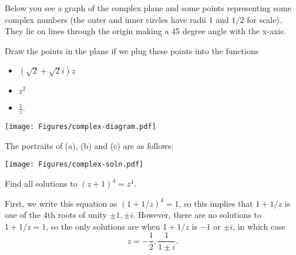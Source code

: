 \documentclass[11pt,dvipsnames]{book}
\numberwithin{equation}{section} %
\numberwithin{figure}{section} %
\numberwithin{table}{section} %
\begin{document}
\begin{exercise}  Below you see a graph of the complex plane and some points representing some complex numbers (the outer and inner circles have radii $1$ and $1/2$ for scale). They lie on lines through the origin making a 45 degree angle with the x-axis.


\begin{multicols}{2}
Draw the points in the plane if we plug these points into the functions
\begin{itemize}
\item $\left(\sqrt{2}+\sqrt{2}i\right)z$
\item $z^2$
\item $\frac{1}{z}$. 
\end{itemize}

\begin{center}
\texttt{[image: Figures/complex-diagram.pdf]}
\end{center}
\end{multicols}


\begin{solution}
The portraits of (a), (b) and (c) are as follows:

\begin{center}
\texttt{[image: Figures/complex-soln.pdf]}
\end{center}
\end{solution}


\end{exercise}


\begin{exercise} Find all solutions to $(z+1)^4=z^4$. 

\begin{solution}
First, we write this equation as $(1+1/z)^4=1$, so this implies that $1+1/z$ is one of the $4$th roots of unity $\pm1,\pm i$. However, there are no solutions to $1+1/z=1$, so the only solutions are when $1+1/z$ is $-1$ or $\pm i$, in which case 
\[
z=-\frac{1}{2}, \frac{1}{1\pm i}.
\]
\end{solution}


\end{exercise}
\end{document}
